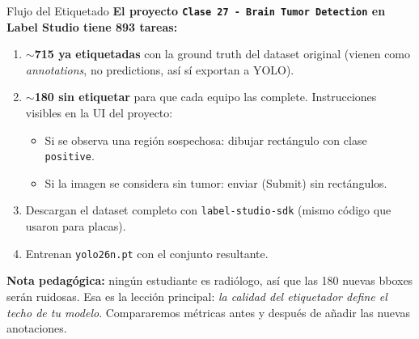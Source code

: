 \begin{frame}[shrink]{Flujo del Etiquetado}
  \vspace{6pt}
  {\footnotesize\color{arcaDark}\bfseries
    El proyecto \texttt{Clase 27 - Brain Tumor Detection} en Label
    Studio tiene 893 tareas:}

  \vspace{10pt}
  {\footnotesize
  \begin{enumerate}\setlength{\itemsep}{5pt}
    \item \textbf{$\sim$715 ya etiquetadas} con la ground truth del
      dataset original (vienen como \emph{annotations}, no predictions,
      as\'i s\'i exportan a YOLO).
    \item \textbf{$\sim$180 sin etiquetar} para que cada equipo las complete.
      Instrucciones visibles en la UI del proyecto:
      \begin{itemize}\setlength{\itemsep}{2pt}
        \item Si se observa una regi\'on sospechosa: dibujar
          rect\'angulo con clase \texttt{positive}.
        \item Si la imagen se considera sin tumor: enviar (Submit) sin
          rect\'angulos.
      \end{itemize}
    \item Descargan el dataset completo con \texttt{label-studio-sdk}
      (mismo c\'odigo que usaron para placas).
    \item Entrenan \texttt{yolo26n.pt} con el conjunto resultante.
  \end{enumerate}
  }

  \vspace{6pt}
  \begin{tcolorbox}[colback=codeGreen!8, colframe=codeGreen, boxrule=0.5pt,
    arc=2pt, left=6pt, right=6pt, top=4pt, bottom=4pt]
    {\scriptsize\color{arcaDark}
    \faLightbulb\hspace{4pt}\textbf{Nota pedag\'ogica:} ning\'un
    estudiante es radi\'ologo, as\'i que las 180 nuevas bboxes ser\'an
    ruidosas. Esa es la lecci\'on principal: \emph{la calidad del
    etiquetador define el techo de tu modelo}. Compararemos m\'etricas
    antes y despu\'es de a\~nadir las nuevas anotaciones.}
  \end{tcolorbox}
\end{frame}

